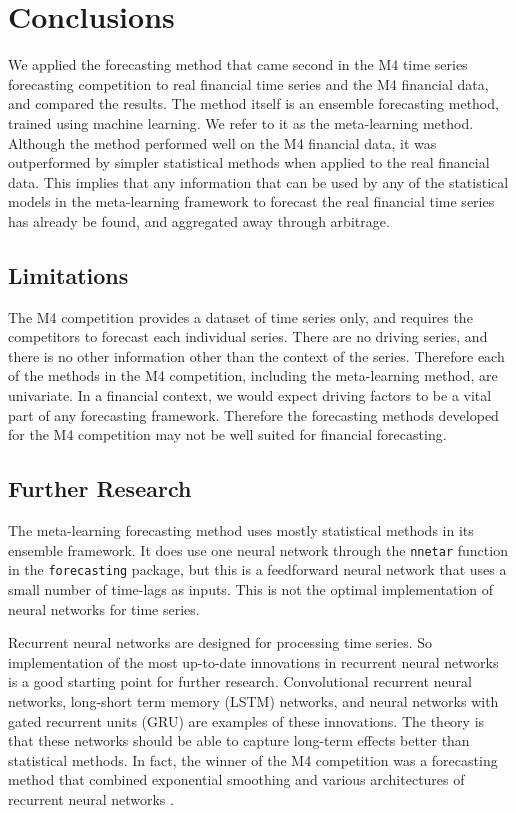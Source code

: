 \documentclass[a4paper,12pt]{article}
\theoremstyle{definition}
\begin{document}
\section{Conclusions}
We applied the forecasting method that came second in the M4 time series forecasting competition to real financial time series and the M4 financial data, and compared the results. The method itself is an ensemble forecasting method, trained using machine learning. We refer to it as the meta-learning method. Although the method performed well on the M4 financial data, it was outperformed by simpler statistical methods when applied to the real financial data. This implies that any information that can be used by any of the statistical models in the meta-learning framework to forecast the real financial time series has already be found, and aggregated away through arbitrage.

\subsection{Limitations}
The M4 competition provides a dataset of time series only, and requires the competitors to forecast each individual series. There are no driving series, and there is no other information other than the context of the series. Therefore each of the methods in the M4 competition, including the meta-learning method, are univariate. In a financial context, we would expect driving factors to be a vital part of any forecasting framework. Therefore the forecasting methods developed for the M4 competition may not be well suited for financial forecasting. 

\subsection{Further Research}
The meta-learning forecasting method uses mostly statistical methods in its ensemble framework. It does use one neural network through the \texttt{nnetar} function in the \texttt{forecasting} package, but this is a feedforward neural network that uses a small number of time-lags as inputs. This is not the optimal implementation of neural networks for time series. 

Recurrent neural networks are designed for processing time series. So implementation of the most up-to-date innovations in recurrent neural networks is a good starting point for further research. Convolutional recurrent neural networks, long-short term memory (LSTM) networks, and neural networks with gated recurrent units (GRU) are examples of these innovations. The theory is that these networks should be able to capture long-term effects better than statistical methods. In fact, the winner of the M4 competition was a forecasting method that combined exponential smoothing and various architectures of recurrent neural networks \cite{m4}.

\newpage


\end{document}
